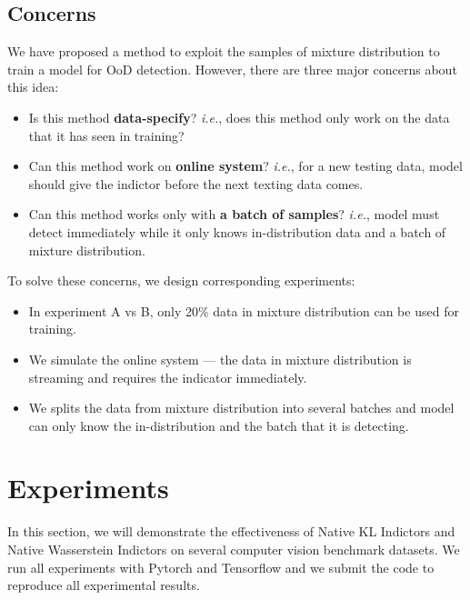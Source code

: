 \documentclass[letterpaper]{article} %
\newcommand{\IE}{\textit{i.e.}, }
\begin{document}
\subsection{Concerns}
We have proposed a method to exploit the samples of mixture distribution to train a model for OoD detection. However, there are three major concerns about this idea: 
\begin{itemize}
	\item Is this method \textbf{data-specify}? \IE does this method only work on the data that it has seen in training? 
	\item Can this method work on \textbf{online system}? \IE for a new testing data, model should give the indictor before the next texting data comes.  
	\item Can this method works only with \textbf{a batch of samples}? \IE model must detect immediately while it only knows in-distribution data and a batch of mixture distribution. 
\end{itemize} 

To solve these concerns, we design corresponding experiments:
\begin{itemize}
	\item In experiment A vs B, only 20\% data in mixture distribution can be used for training. 
	\item We simulate the online system --- the data in mixture distribution is streaming and requires the indicator immediately. 
	\item We splits the data from mixture distribution into several batches and model can only know the in-distribution and the batch that it is detecting. 
\end{itemize}

\section{Experiments}
In this section, we will demonstrate the effectiveness of Native KL Indictors and Native Wasserstein Indictors on several computer vision benchmark datasets. We run all experiments with Pytorch and Tensorflow and we submit the code to reproduce all experimental results. 
\end{document}
